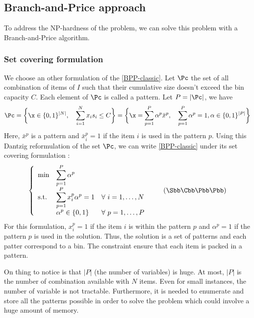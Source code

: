 \subsection{Branch-and-Price approach }

To address the NP-hardness of the problem, we can solve this problem with a Branch-and-Price algorithm.

\subsubsection{Set covering formulation}

We choose an other formulation of the \eqref{BPP-classic}. Let $\Pc$ the set of all combination of items of $I$ such that their cumulative size doesn't exceed the bin capacity $C$. Each element of $\Pc$ is called a pattern. Let $P=|\Pc|$, we have
\begin{equation*}
	\Pc = \bigg \{ \x \in \{0,1\}^{|N|}, \quad \sum_{i=1}^N x_i s_i \leq C \bigg \} = \bigg \{ \x = \sum_{p=1}^P \alpha^p \bar{x}^p, \quad \sum_{p=1}^P \alpha^p = 1, \alpha \in \{0,1\}^{|P|}  \bigg \}
\end{equation*}
Here, $\bar{x}^p$ is a pattern and $\bar{x}^p_i=1$ if the item $i$ is used in the pattern $p$. Using this Dantzig reformulation of the set $\Pc$, we can write \eqref{BPP-classic} under its set covering formulation :
\begin{equation}
	\label{SCBPP}
		\left \{
		\begin{array}{*5{>{\displaystyle}l}}
		\min & \sum_{p=1}^P \alpha^p \\
		\st & \sum_{p=1}^P x_i^p\alpha^p = 1 & \forall \ i = 1,\dots,N \\
		& \alpha^{p} \in \{0,1\} &  \forall \ p = 1,\dots,P
		\end{array}
		\right.
	\tag{$\Sbb\Cbb\Bbb\Pbb\Pbb$}
\end{equation}
For this formulation, $x_i^p=1$ if the item $i$ is within the pattern $p$ and $\alpha^p=1$ if the pattern $p$ is used in the solution. Thus, the solution is a set of patterns and each patter correspond to a bin. The constraint ensure that each item is packed in a pattern.

On thing to notice is that $|P|$ (the number of variables) is huge. At most, $|P|$ is the number of combination available with $N$ items. Even for small instances, the number of variable is not tractable. Furthermore, it is needed to enumerate and store all the patterns possible in order to solve the problem which could involve a huge amount of memory. 

